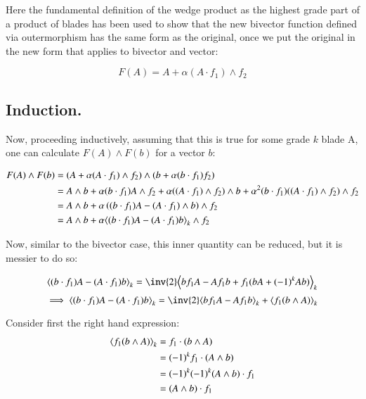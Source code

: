 Here the fundamental definition of the wedge product as the 
highest grade part of a product of blades has been used to show that the new
bivector function defined via outermorphism has the same form as the original, once we put the original in the new form that applies to bivector and vector:

\begin{equation}
F(A) = A + \alpha(A \cdot f_1) \wedge f_2 
\end{equation}

\subsection{Induction. }

Now, proceeding inductively, assuming that this is true for some grade $k$ blade A, one can calculate $F(A) \wedge F(b)$ for a vector $b$:

\begin{align*}
F(A) \wedge F(b)
&= (A + \alpha(A \cdot f_1) \wedge f_2) \wedge (b + \alpha(b \cdot f_1) f_2 ) \\
&= A \wedge b 
+ \alpha( b \cdot f_1 ) A \wedge f_2 
+ \alpha (( A \cdot f_1) \wedge f_2) \wedge b
+ \alpha^2 (b \cdot f_1) ((A \cdot f_1) \wedge f_2) \wedge f_2 \\
&= A \wedge b + \alpha \left( ( b \cdot f_1 ) A - ( A \cdot f_1) \wedge b \right) \wedge f_2 \\
&= A \wedge b + \alpha {\left\langle{{ ( b \cdot f_1 ) A - ( A \cdot f_1) b}}\right\rangle}_{k} \wedge f_2 \\
\end{align*}

Now, similar to the bivector case, this inner quantity can be reduced, but it is messier to do so:

\begin{align*}
\gpgrade{ ( b \cdot f_1 ) A - ( A \cdot f_1) b}{k}
&= \inv{2} \gpgrade{ b f_1 A - A f_1 b + f_1 (b A + (-1)^{k} A b) }{k} \\
\end{align*}
\begin{equation} \label{eqn:outermorphism_det:r1}
\implies
\gpgrade{ ( b \cdot f_1 ) A - ( A \cdot f_1) b}{k} = \inv{2} \gpgrade{ b f_1 A - A f_1 b}{k} + \gpgrade{ f_1 (b \wedge A) }{k}
\end{equation}

Consider first the right hand expression:
\begin{align*}
{\left\langle{{ f_1 (b \wedge A) }}\right\rangle}_{k} 
&= f_1 \cdot (b \wedge A) \\
&= (-1)^{k} f_1 \cdot (A \wedge b) \\
&= (-1)^{k} (-1)^k (A \wedge b) \cdot f_1 \\
&= (A \wedge b) \cdot f_1 \\
\end{align*}

